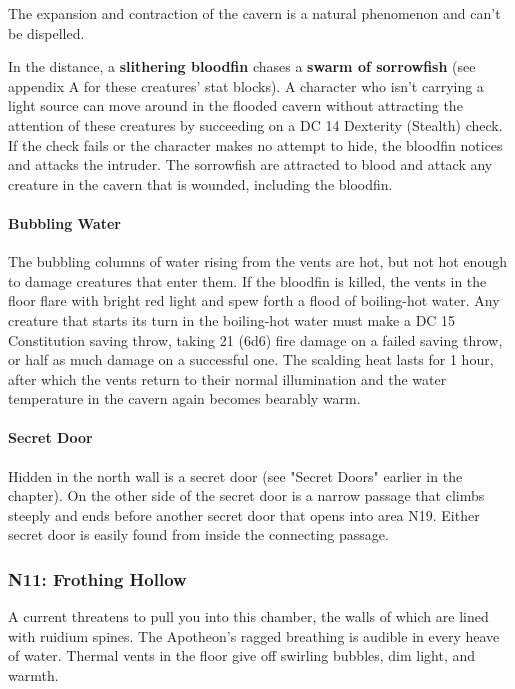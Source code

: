 \documentclass[10pt,a4paper,twoside,bg=print,twocolumn,openany,nodeprecatedcode]{dndbook}
\begin{document}
The expansion and contraction of the cavern is a natural phenomenon and can't be dispelled.

In the distance, a \textbf{slithering bloodfin} chases a \textbf{swarm of sorrowfish} (see appendix A for these creatures' stat blocks). A character who isn't carrying a light source can move around in the flooded cavern without attracting the attention of these creatures by succeeding on a DC 14 Dexterity (Stealth) check. If the check fails or the character makes no attempt to hide, the bloodfin notices and attacks the intruder. The sorrowfish are attracted to blood and attack any creature in the cavern that is wounded, including the bloodfin.

\paragraph{Bubbling Water}
The bubbling columns of water rising from the vents are hot, but not hot enough to damage creatures that enter them. If the bloodfin is killed, the vents in the floor flare with bright red light and spew forth a flood of boiling-hot water. Any creature that starts its turn in the boiling-hot water must make a DC 15 Constitution saving throw, taking 21 (6d6) fire damage on a failed saving throw, or half as much damage on a successful one. The scalding heat lasts for 1 hour, after which the vents return to their normal illumination and the water temperature in the cavern again becomes bearably warm.

\paragraph{Secret Door}
Hidden in the north wall is a secret door (see "Secret Doors" earlier in the chapter). On the other side of the secret door is a narrow passage that climbs steeply and ends before another secret door that opens into area N19. Either secret door is easily found from inside the connecting passage.

\subsubsection{N11: Frothing Hollow}
\begin{DndReadAloud}{}
A current threatens to pull you into this chamber, the walls of which are lined with ruidium spines. The Apotheon's ragged breathing is audible in every heave of water. Thermal vents in the floor give off swirling bubbles, dim light, and warmth.

\end{DndReadAloud}
\end{document}
